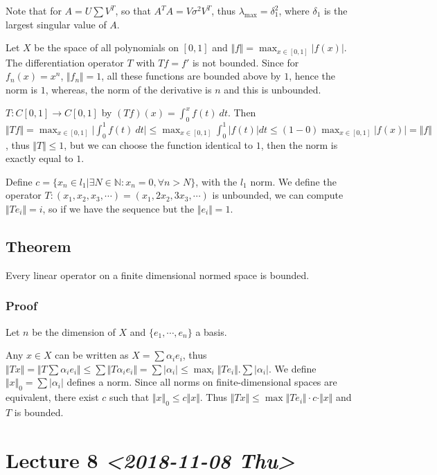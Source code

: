 \documentclass[11pt]{article}
\def\N{\mathbb{N}}
\begin{document}
Note that for \(A = U \sum V^T\), so that \(A^{T} A = V \sigma^2 V^{T}\), thus
\(\lambda_{\max} = \delta_{1}^2\), where \(\delta_1\) is the largest singular
value of \(A\).

Let \(X\) be the space of all polynomials on \([0, 1]\) and \(\Vert f \Vert =
   \max_{x \in [0, 1]} \vert f (x) \vert\). The differentiation operator \(T\) with
\(Tf = f'\) is not bounded. Since for \(f_n(x) = x^n\), \(\Vert f_n\Vert = 1\), all
these functions are bounded above by \(1\), hence the norm is \(1\), whereas, the
norm of the derivative is \(n\) and this is unbounded.

\(T \colon C[0, 1] \rightarrow C[0, 1]\) by \((Tf)(x) = \int_{0}^{x} f(t)\ dt\).
Then \(\Vert T f\Vert = \max_{x \in [0, 1]} \vert \int_{0}^{1} f(t)\ dt\vert
   \le \max_{x \in [0, 1]} \int_{0}^{1} \vert f(t) \vert dt \le (1-0) \max_{x\in
   [0, 1]} \vert f(x) \vert = \Vert f \Vert\), thus \(\Vert T \Vert \le 1\), but we
can choose the function identical to \(1\), then the norm is exactly equal to
\(1\).

Define \(c = \{x_n \in l_1 \vert \exists N \in \N \colon x_n = 0, \forall n >
   N\}\), with the \(l_1\) norm. We define the operator \(T\colon (x_1, x_2, x_3,
   \cdots) = (x_1, 2x_2, 3x_3, \cdots)\) is unbounded, we can compute \(\Vert T
   e_i \Vert = i\), so if we have the sequence but the \(\Vert e_i \Vert = 1\).
\subsection{Theorem}
\label{sec:org2172154}
Every linear operator on a finite dimensional normed space is bounded.
\subsubsection{Proof}
\label{sec:org1d804fe}
Let \(n\) be the dimension of \(X\) and \(\{e_1, \cdots, e_n\}\) a basis.

Any \(x\in X\) can be written as \(X = \sum \alpha_i e_i\), thus \(\Vert Tx \Vert
    = \Vert T \sum \alpha_i e_i\Vert \le \sum \Vert T \alpha_i e_i\Vert = \sum
    \vert \alpha_i \vert \le \max_{i} \Vert T e_i \Vert . \sum \vert \alpha_i
    \vert\). We define \(\Vert x \Vert_0 = \sum \vert \alpha_i \vert\) defines a
norm. Since all norms on finite-dimensional spaces are equivalent, there
exist \(c\) such that \(\Vert x \Vert_0 \le c \Vert x \Vert\). Thus \(\Vert T
    x\Vert \le \max \Vert T e_i \Vert \cdot c \cdot \Vert x \Vert\) and \(T\) is
bounded.
\section{Lecture 8 \textit{<2018-11-08 Thu>}}
\label{sec:orgf84f619}
\end{document}
